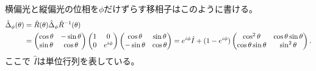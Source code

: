 \documentclass[9pt,dvipdfmx,a4paper]{jsarticle}
\begin{document}
横偏光と縦偏光の位相を\(\phi\)だけずらす移相子はこのように書ける。
\begin{align}
    \hat{\Delta}_\phi(\theta) &= \hat{R}(\theta) \hat{\Delta}_\phi  \hat{R}^{-1}(\theta) \notag\\
    &= \begin{pmatrix}
        \cos \theta & -\sin\theta\\
        \sin\theta & \cos\theta
    \end{pmatrix}
    \begin{pmatrix}
        1 & 0\\
        0 & e^{i\phi}
    \end{pmatrix}
    \begin{pmatrix}
        \cos \theta & \sin\theta\\
        -\sin\theta & \cos\theta
    \end{pmatrix}
    =e^{i\phi} \hat{I} + (1-e^{i\phi})\begin{pmatrix}
        \cos^2 \theta & \cos\theta\sin\theta\\
        \cos\theta\sin\theta & \sin^2\theta
    \end{pmatrix}.
\end{align}
ここで \(\hat{I}\)は単位行列を表している。
\end{document}
